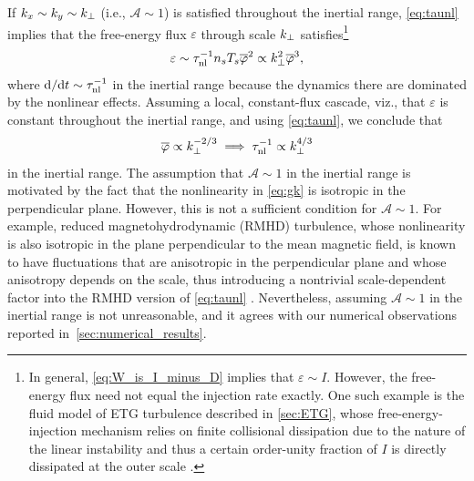 \documentclass{jpp}
\newcommand{\taunl}{\tau_\text{nl}}
\newcommand{\phinorm}{\varphi}
\newcommand{\phinormk}{\overline{\phinorm}}
\newcommand{\A}{\mathcal{A}}
\begin{document}
If \mbox{\(k_x \sim k_y \sim k_\perp\)} (i.e., \(\A \sim 1\)) is satisfied throughout the inertial range, \cref{eq:taunl} implies that the free-energy flux \(\varepsilon\) through scale \(k_\perp\) satisfies\footnote{In general, \cref{eq:W_is_I_minus_D} implies that \(\varepsilon \sim I\). However, the free-energy flux need not equal the injection rate exactly. One such example is the fluid model of ETG turbulence described in \cref{sec:ETG}, whose free-energy-injection mechanism relies on finite collisional dissipation due to the nature of the linear instability and thus a certain order-unity fraction of \(I\) is directly dissipated at the outer scale \citep{adkins23}.}
\begin{equation}
	\varepsilon \sim \taunl^{-1} n_{\s} T_{\s} \phinormk^2 \propto \kperp^2 \phinormk^3,
	\label{eq:constant_energy_cascade}
\end{equation}
where \(\rmd/\rmd t \sim \taunl^{-1}\) in the inertial range because the dynamics there are dominated by the nonlinear effects. Assuming a local, constant-flux cascade, viz., that \(\varepsilon\) is constant throughout the inertial range, and using \cref{eq:taunl}, we conclude that
\begin{equation}
	\phinormk \propto \kperp^{-2/3} \implies \taunl^{-1} \propto \kperp^{4/3}
	\label{eq:inertial_range_scaling}
\end{equation}
in the inertial range. The assumption that \(\A \sim  1\) in the inertial range is motivated by the fact that the nonlinearity in \cref{eq:gk} is isotropic in the perpendicular plane. However, this is not a sufficient condition for \(\A \sim 1\). For example, reduced magnetohydrodynamic (RMHD) turbulence, whose nonlinearity is also isotropic in the plane perpendicular to the mean magnetic field, is known to have fluctuations that are anisotropic in the perpendicular plane and whose anisotropy depends on the scale, thus introducing a nontrivial scale-dependent factor into the RMHD version of \cref{eq:taunl} \citep{boldyrev06,boldyrev09exact, mallet16, mallet17a, schekochihin22_mhd}. Nevertheless, assuming \(\A \sim 1\) in the inertial range is not unreasonable, and it agrees with our numerical observations reported in~\cref{sec:numerical_results}.
\end{document}
